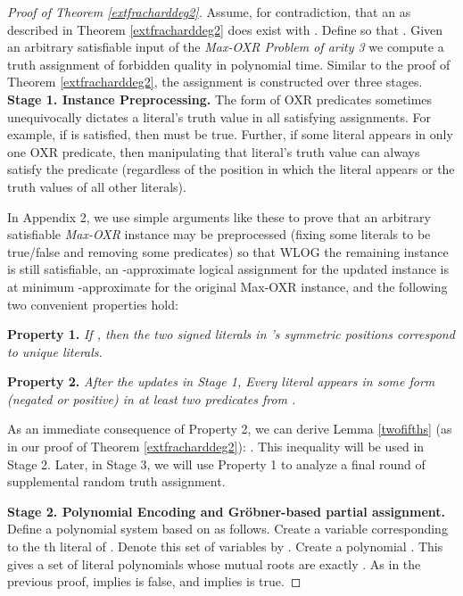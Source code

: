 \documentclass{article}
\begin{document}
\begin{proof}[Proof of Theorem \ref{extfracharddeg2}]  Assume, for contradiction, that an  as described in Theorem \ref{extfracharddeg2} does exist with . Define  so that . Given an arbitrary satisfiable input  of the \textit{Max-OXR Problem of arity 3} we compute a truth  assignment of forbidden quality in polynomial time. Similar to the proof of Theorem \ref{extfracharddeg2}, the assignment is constructed over three stages.\\

\noindent \textbf{Stage 1. Instance Preprocessing.} The form of OXR predicates sometimes unequivocally dictates a literal's truth value in all satisfying assignments. For example, if  is satisfied, then  must be true. Further, if some literal appears in only one OXR predicate, then manipulating that literal's truth value can always satisfy the predicate (regardless of the position in which the literal appears or the truth values of all other literals).  

In Appendix 2,  we use simple arguments like these to prove that an arbitrary satisfiable \textit{Max-OXR} instance may be preprocessed (fixing some literals to be true/false and removing some predicates) so that
WLOG the remaining instance is still satisfiable, an -approximate logical assignment for the updated instance is at minimum -approximate for the original Max-OXR instance, and
the following two convenient properties hold:

\vspace{1mm}
\noindent \textbf{Property 1.} \textit{If , then the two signed literals in 's symmetric positions correspond to unique literals.} 
\vspace{1mm}


\noindent \textbf{Property 2.} \textit{After the updates in Stage 1, Every literal  appears in some form (negated or positive) in at least two predicates from .}

\vspace{1mm}
\noindent As an immediate consequence of Property 2, we can derive Lemma \ref{twofifths} (as in our proof of Theorem \ref{extfracharddeg2}): . This inequality will be used in Stage 2. Later, in Stage 3, we will use Property 1 to analyze a final round of supplemental random truth assignment.

\vspace{2mm}
\noindent \textbf{Stage 2.  Polynomial Encoding and Gr\"{o}bner-based partial assignment. } Define a polynomial system based on  as follows. Create a variable  corresponding to the th literal of . Denote this set of variables by . Create a polynomial . This gives a set of  literal polynomials whose mutual roots are exactly . As in the previous proof,  implies  is false, and  implies  is true. 


\end{proof}
\end{document}
